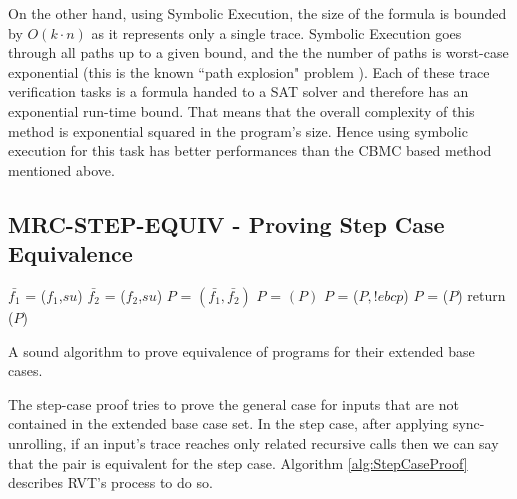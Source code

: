 On the other hand, using Symbolic Execution, the size of the formula is bounded by $O(k{\cdot}n)$ as it represents only a single trace. Symbolic Execution goes through all paths up to a given bound, and the the number of paths is worst-case exponential (this is the known ``path explosion" problem  \cite{10.1007/978-3-540-78800-3_28}). Each of these trace verification tasks is a formula handed to a SAT solver and therefore has an exponential run-time bound. That means that the overall complexity of this method is exponential squared in the program's size. 
Hence using symbolic execution for this task has better performances than the CBMC based method mentioned above.


\subsection{MRC-STEP-EQUIV - Proving Step Case Equivalence}
\label{sec:MRC-STEP-EQUIV}
\noindent
\begin{algorithm}
\begin{minipage}{\linewidth}
\begin{algorithmic}[1]
	\State$\bar{f_1}$ = ($f_1$,$su$)
	\State$\bar{f_2}$ = ($f_2$,$su$)
	\State $P$ = $(\bar{f_1},\bar{f_2})$
	\State $P$ = $(P)$
	\State $P$ = ($P,!ebcp$)
    \State $P$ = ($P$)
    \State return ($P$)
	\EndFunction
\end{algorithmic}
\end{minipage}
\caption{A sound algorithm to prove equivalence of programs for their extended base cases.}
\label{alg:StepCaseProof}
\end{algorithm}
The step-case proof tries to prove the general case for inputs that are not contained in the extended base case set. In the step case, after applying sync-unrolling, if an input's trace reaches only related recursive calls then we can say that the pair is equivalent for the step case. Algorithm \ref{alg:StepCaseProof} describes RVT's process to do so.
